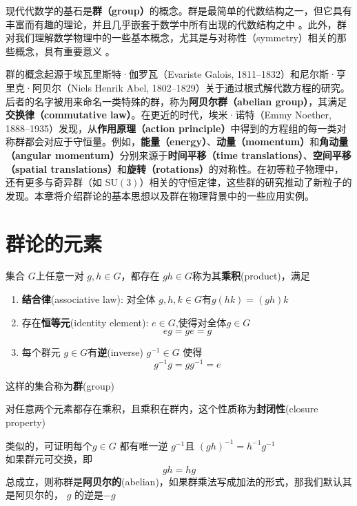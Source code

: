 现代代数学的基石是\textbf{群（group）}的概念。群是最简单的代数结构之一，但它具有丰富而有趣的理论，并且几乎嵌套于数学中所有出现的代数结构之中 。此外，群对我们理解数学物理中的一些基本概念，尤其是与对称性（symmetry）相关的那些概念，具有重要意义 。

群的概念起源于埃瓦里斯特·伽罗瓦（Evariste Galois, 1811--1832）和尼尔斯·亨里克·阿贝尔（Niels Henrik Abel, 1802--1829）关于通过根式解代数方程的研究。后者的名字被用来命名一类特殊的群，称为\textbf{阿贝尔群（abelian group）}，其满足\textbf{交换律（commutative law）}。在更近的时代，埃米·诺特（Emmy Noether, 1888--1935）发现，从\textbf{作用原理（action principle）}中得到的方程组的每一类对称群都会对应于守恒量。例如，\textbf{能量（energy）}、\textbf{动量（momentum）}和\textbf{角动量（angular momentum）}分别来源于\textbf{时间平移（time translations）}、\textbf{空间平移（spatial translations）}和\textbf{旋转（rotations）}的对称性。在初等粒子物理中，还有更多与奇异群（如 $\mathrm{SU}(3)$）相关的守恒定律，这些群的研究推动了新粒子的发现。本章将介绍群论的基本思想以及群在物理背景中的一些应用实例。
\section{群论的元素}\label{sec:2.1}
集合 $G$上任意一对 $g,h\in G$，都存在 $gh\in G$称为其\textbf{乘积}(product)，满足
\begin{enumerate}[label=(Gp\arabic*),ref=Gp\arabic*]
    \item \label{gp:1}
    \textbf{结合律}(associative law): 对全体 $g,h,k\in G$有$g(hk)=(gh)k$  
    \item \label{gp:2}
    存在\textbf{恒等元}(identity element): $e\in G$,使得对全体\(g\in G\)
    \[eg=ge=g\]
    \item \label{gp:3}
    每个群元 $g\in G$有\textbf{逆}(inverse) $g^{-1}\in G$ 使得\[g^{-1}g=gg^{-1}=e\] 
\end{enumerate}
这样的集合称为\textbf{群}(group)

对任意两个元素都存在乘积，且乘积在群内，这个性质称为\textbf{封闭性}(closure property)

类似的，可证明每个$g\in G$ 都有唯一逆 $g^{-1}$且 $(gh)^{-1}=h^{-1}g^{-1}$ 
\\
如果群元可交换，即\[gh=hg\]总成立，则称群是\textbf{阿贝尔的}(abelian)，如果群乘法写成加法的形式，那我们默认其是阿贝尔的， $g$ 的逆是$-g$ 

